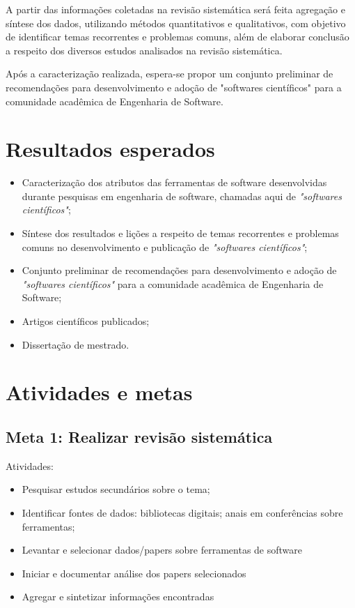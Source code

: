 \documentclass[12pt]{article}
\begin{document}
A partir das informações coletadas na revisão sistemática será feita agregação
e síntese dos dados, utilizando métodos quantitativos e qualitativos, com
objetivo de identificar temas recorrentes e problemas comuns, além de elaborar
conclusão a respeito dos diversos estudos analisados na revisão sistemática.

Após a caracterização realizada, espera-se propor um conjunto preliminar de
recomendações para desenvolvimento e adoção de "softwares científicos" para a
comunidade acadêmica de Engenharia de Software.

\section{Resultados esperados}

\begin{itemize}
  \item Caracterização dos atributos das ferramentas de software desenvolvidas
    durante pesquisas em engenharia de software, chamadas aqui de \textit{"softwares científicos"};
  \item Síntese dos resultados e lições a respeito de temas recorrentes e
    problemas comuns no desenvolvimento e publicação de \textit{"softwares
      científicos"};
  \item Conjunto preliminar de recomendações para desenvolvimento e adoção de
    \textit{"softwares científicos"} para a comunidade acadêmica de Engenharia de
    Software;
  \item Artigos científicos publicados;
  \item Dissertação de mestrado.
\end{itemize}

\section{Atividades e metas}

\subsection{Meta 1: Realizar revisão sistemática}

Atividades:

\begin{itemize}
  \item Pesquisar estudos secundários sobre o tema;
  \item Identificar fontes de dados: bibliotecas digitais; anais em
    conferências sobre ferramentas;
  \item Levantar e selecionar dados/papers sobre ferramentas de software
  \item Iniciar e documentar análise dos papers selecionados
  \item Agregar e sintetizar informações encontradas
\end{itemize}
\end{document}

